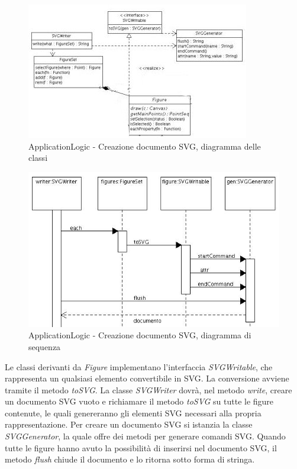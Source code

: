 \begin{figure}[!ht]
\centering
\includegraphics{ClassiScritturaSVG.jpg}
\caption{ApplicationLogic - Creazione documento SVG, diagramma delle classi}
\end{figure}

\begin{figure}[!ht]
\centering
\includegraphics{ScritturaSVG.jpg}
\caption{ApplicationLogic - Creazione documento SVG, diagramma di sequenza}
\end{figure}

Le classi derivanti da \textit{Figure} implementano l'interfaccia \textit{SVGWritable}, che rappresenta un qualsiasi elemento convertibile in SVG. La conversione avviene tramite il metodo \textit{toSVG}. La classe \textit{SVGWriter} dovr\`a, nel metodo \textit{write}, creare un documento SVG vuoto e richiamare il metodo \textit{toSVG} su tutte le figure contenute, le quali genereranno gli elementi SVG necessari alla propria rappresentazione. Per creare un documento SVG si istanzia la classe \textit{SVGGenerator}, la quale offre dei metodi per generare comandi SVG. Quando tutte le figure hanno avuto la possibilit\`a di inserirsi nel documento SVG, il metodo \textit{flush} chiude il documento e lo ritorna sotto forma di stringa.
